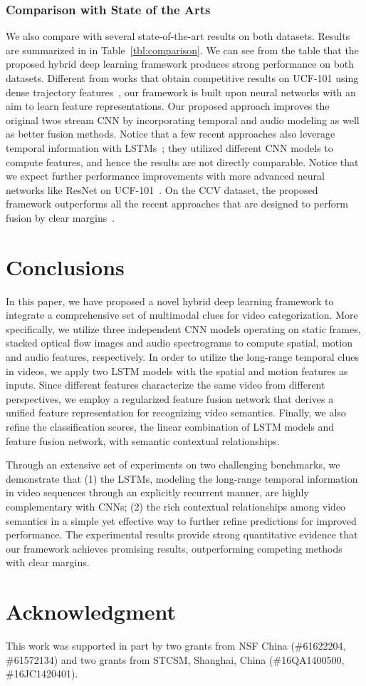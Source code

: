 \documentclass[journal]{IEEEtran}
\begin{document}
\subsubsection{Comparison with State of the Arts}
We also compare with several state-of-the-art results on both datasets. Results are summarized in in Table~\ref{tbl:comparison}. We can see from the table that the proposed hybrid deep learning framework produces strong performance on both datasets. Different from works that obtain competitive results on UCF-101 using dense trajectory features~\cite{wang2013action,Zha2015}, our framework is built upon neural networks with an aim to learn feature representations. Our proposed approach improves the original twos stream CNN by incorporating temporal and audio modeling as well as better fusion methods. Notice that a few recent approaches also leverage temporal information with LSTMs~\cite{Donahue2015,Srivastava2015}; they utilized different CNN models to compute features, and hence the results are not directly comparable. Notice that we expect further performance improvements with more advanced neural networks like ResNet on UCF-101~\cite{Wang2016a,Feichtenhofer2016}.
On the CCV dataset, the proposed framework outperforms all the recent approaches that are designed to perform fusion by clear margins~\cite{xu2013feature,ye2012robust,MVA:audiovisual,DBLP:journals/ijcv/MaY14,liu2013sample,mm14:videoclassification}.

\section{Conclusions}
\label{sec:conclusion}
In this paper, we have proposed a novel hybrid deep learning framework to integrate a comprehensive set of multimodal clues for video categorization. More specifically, we utilize three independent CNN models operating on static frames, stacked optical flow images and audio spectrograms to compute spatial, motion and audio features, respectively. In order to utilize the long-range temporal clues in videos, we apply two LSTM models with the spatial and motion features as inputs. Since different features characterize the same video from different perspectives, we employ a regularized feature fusion network that derives a unified feature representation for recognizing video semantics. Finally, we also refine the classification scores, the linear combination of LSTM models and feature fusion network, with semantic contextual relationships. 

Through an extensive set of experiments on two challenging benchmarks, we demonstrate that (1) the LSTMs, modeling the long-range temporal information in video sequences through an explicitly recurrent manner, are highly complementary with CNNs; (2) the rich contextual relationships among video semantics in a simple yet effective way to further refine predictions for improved performance. The experimental results provide strong quantitative evidence that our framework achieves promising results, outperforming competing methods with clear margins.



\section*{Acknowledgment}
This work was supported in part by two grants from NSF China (\#61622204, \#61572134) and two grants from STCSM, Shanghai, China (\#16QA1400500, \#16JC1420401).


\scriptsize


\end{document}
